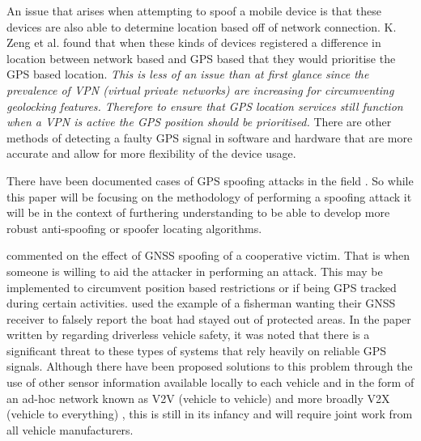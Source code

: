 \medskip

An issue that arises when attempting to spoof a mobile device is that these devices are also able to determine location based off of
network connection. 
K. Zeng et al. \cite{RN9} found that when these kinds of devices registered a difference in location between network based and GPS based
that they would prioritise the GPS based location. \emph{This is less of an issue than at first glance since the prevalence of VPN (virtual private networks)
are increasing for circumventing geolocking features. Therefore to ensure that GPS location services still function when a VPN is active
the GPS position should be prioritised.} There are other methods of detecting a faulty GPS signal in software and hardware that are
more accurate and allow for more flexibility of the device usage. 

\medskip

There have been documented cases of GPS spoofing attacks in the field . So while this paper 
will be focusing on the methodology of performing a spoofing attack it will be in the context of furthering understanding to be able to develop 
more robust anti-spoofing or spoofer locating algorithms.

\bigskip

\citeauthor{RN12} \cite{RN12} commented on the effect of GNSS spoofing of a cooperative victim. That is when someone is willing to aid the attacker
in performing an attack. This may be implemented to circumvent position based restrictions or if being GPS tracked during certain activities.
\citeauthor{RN12} used the example of a fisherman wanting their GNSS receiver to falsely report the boat had stayed out of protected areas.
In the paper written by \citeauthor{RN25} \cite{RN25} regarding driverless vehicle safety, it was noted that there is a significant threat to these types
of systems that rely heavily on reliable GPS signals. Although there have been proposed solutions to this problem through the use of 
other sensor information available locally to each vehicle and in the form of an ad-hoc network known as V2V (vehicle to vehicle) and more broadly
V2X (vehicle to everything) \cite{RN17}, this is still in its infancy and will require joint work from all vehicle manufacturers.   

\bigskip


